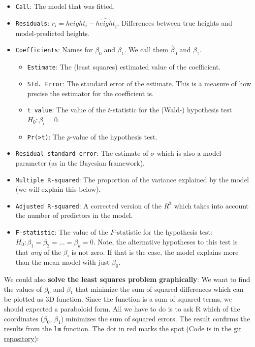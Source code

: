 \documentclass[
]{book}
\providecommand{\tightlist}{%
  \setlength{\itemsep}{0pt}\setlength{\parskip}{0pt}}
\begin{document}
\begin{itemize}
\tightlist
\item
  \texttt{Call}: The model that was fitted.
\item
  \texttt{Residuals}: \(r_i = height_i - \widehat{height}_i\).
  Differences between true heights and model-predicted heights.
\item
  \texttt{Coefficients}: Names for \(\beta_0\) and \(\beta_1\). We call them \(\hat{\beta}_0\) and \(\hat{\beta}_1\).

  \begin{itemize}
  \tightlist
  \item
    \texttt{Estimate}: The (least squares) estimated value of the coefficient.
  \item
    \texttt{Std.\ Error}: The standard error of the estimate.
    This is a measure of how precise the estimator for the coefficient is.
  \item
    \texttt{t\ value}: The value of the \(t\)-statistic for the (Wald-) hypothesis test
    \(H_0: \beta_i = 0\).
  \item
    \texttt{Pr(\textgreater{}\textbar{}t\textbar{})}: The \(p\)-value of the hypothesis test.
  \end{itemize}
\item
  \texttt{Residual\ standard\ error}: The estimate of \(\sigma\)
  which is also a model parameter (as in the Bayesian framework).
\item
  \texttt{Multiple\ R-squared}: The proportion of the variance explained by the
  model (we will explain this below).
\item
  \texttt{Adjusted\ R-squared}: A corrected version of the \(R^2\) which takes into account
  the number of predictors in the model.
\item
  \texttt{F-statistic}: The value of the \(F\)-statistic for the hypothesis test:
  \(H_0: \beta_1 = \beta_2 = \dots = \beta_k = 0\). Note, the alternative
  hypotheses to this test is that \emph{any} of the \(\beta_i\) is not zero. If that is
  the case, the model explains more than the mean model with just \(\beta_0\).
\end{itemize}

We could also \textbf{solve the least squares problem graphically}: We want to find the
values of \(\beta_0\) and \(\beta_1\) that minimize the sum of squared differences
which can be plotted as 3D function. Since the function is a sum of squared terms,
we should expected a paraboloid form.
All we have to do is to ask R which of
the coordinates (\(\beta_0\), \(\beta_1\)) minimizes the sum of squared errors.
The result confirms
the results from the \texttt{lm} function. The dot in red marks the spot
(Code is in the \href{https://github.com/jdegenfellner/Script_QM2_ZHAW}{git repository}):
\end{document}
